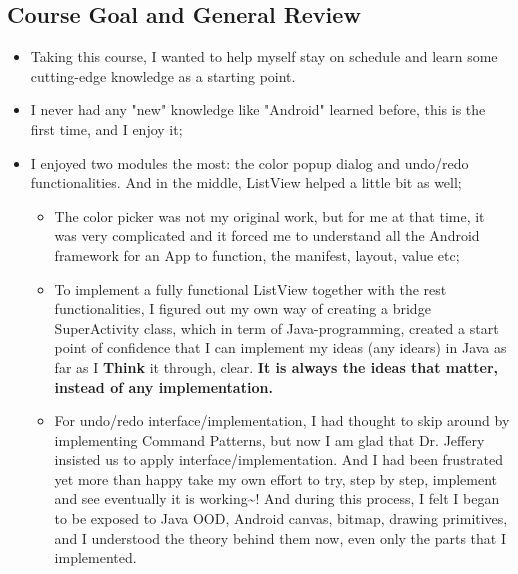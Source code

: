 \documentclass[9pt,b5paper]{article}
\begin{document}
\subsection{Course Goal and General Review}
\label{sec-7-1}
\begin{itemize}
\item Taking this course, I wanted to help myself stay on schedule and learn some cutting-edge knowledge as a starting point.
\item I never had any "new" knowledge like "Android" learned before, this is the first time, and I enjoy it;
\item I enjoyed two modules the most: the color popup dialog and undo/redo functionalities. And in the middle, ListView helped a little bit as well;
\begin{itemize}
\item The color picker was not my original work, but for me at that time, it was very complicated and it forced me to understand all the Android framework for an App to function, the manifest, layout, value etc;
\item To implement a fully functional ListView together with the rest functionalities, I figured out my own way of creating a bridge SuperActivity class, which in term of Java-programming, created a start point of confidence that I can implement my ideas (any idears) in Java as far as I \textbf{Think} it through, clear. \textbf{It is always the ideas that matter, instead of any implementation.}
\item For undo/redo interface/implementation, I had thought to skip around by implementing Command Patterns, but now I am glad that Dr. Jeffery insisted us to apply interface/implementation. And I had been frustrated yet more than happy take my own effort to try, step by step, implement and see eventually it is working\textasciitilde{}! And during this process, I felt I began to be exposed to Java OOD, Android canvas, bitmap, drawing primitives, and I understood the theory behind them now, even only the parts that I implemented.
\end{itemize}
\end{itemize}
\end{document}
